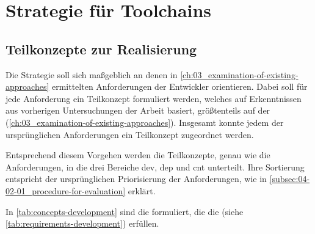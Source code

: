 \section{Strategie für Toolchains}
\label{sec:05-02_strategy-for-toolchains}

\subsection{Teilkonzepte zur Realisierung}
\label{subsec:05-02-01_sub-concepts-for-implementation}

Die  Strategie soll sich maßgeblich an denen in \autoref{ch:03_examination-of-existing-approaches} ermittelten Anforderungen der Entwickler orientieren. Dabei soll für jede Anforderung ein Teilkonzept formuliert werden, welches auf Erkenntnissen aus vorherigen Untersuchungen der Arbeit basiert, größtenteils auf der  (\autoref{ch:03_examination-of-existing-approaches}). Insgesamt konnte jedem der ursprünglichen Anforderungen ein Teilkonzept zugeordnet werden.

Entsprechend diesem Vorgehen werden die Teilkonzepte, genau wie die Anforderungen, in die drei Bereiche \Gls{dev}, \Gls{dep} und \Gls{cnt} unterteilt. Ihre Sortierung entspricht der ursprünglichen Priorisierung der Anforderungen, wie in \autoref{subsec:04-02-01_procedure-for-evaluation} erklärt.

In \autoref{tab:concepts-development} sind die  formuliert, die die  (siehe \autoref{tab:requirements-development}) erfüllen.

